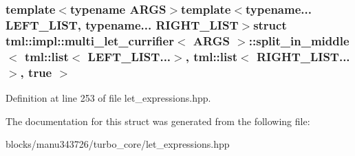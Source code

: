 \subsubsection*{template$<$typename A\+R\+G\+S$>$template$<$typename... L\+E\+F\+T\+\_\+\+L\+I\+S\+T, typename... R\+I\+G\+H\+T\+\_\+\+L\+I\+S\+T$>$struct tml\+::impl\+::multi\+\_\+let\+\_\+currifier$<$ A\+R\+G\+S $>$\+::split\+\_\+in\+\_\+middle$<$ tml\+::list$<$ L\+E\+F\+T\+\_\+\+L\+I\+S\+T...$>$, tml\+::list$<$ R\+I\+G\+H\+T\+\_\+\+L\+I\+S\+T...$>$, true $>$}



Definition at line 253 of file let\+\_\+expressions.\+hpp.



The documentation for this struct was generated from the following file\+:\begin{DoxyCompactItemize}
\item 
blocks/manu343726/turbo\+\_\+core/let\+\_\+expressions.\+hpp\end{DoxyCompactItemize}
